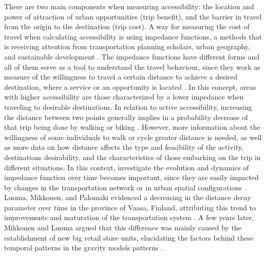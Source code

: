 \documentclass[preprint, 3p,
authoryear]{elsarticle} %
\begin{document}
There are two main components when measuring accessibility: the location
and power of attraction of urban opportunities (trip benefit), and the
barrier in travel from the origin to the destination (trip cost). A way
for measuring the cost of travel when calculating accessibility is using
impedance functions, a methods that is receiving attention from
transportation planning scholars, urban geography, and sustainable
development
\citep{frank2005linking, krizek2005perspectives, currie2010quantifying, iacono2010, yang2012walking, millward2013active, nassir2016utility, saghapour2017measuring, wu2019measuring}.
The impedance functions have different forms and all of them serve as a
tool to understand the travel behaviour, since they work as measure of
the willingness to travel a certain distance to achieve a desired
destination, where a service or an opportunity is located
\citep{taylor1975distance, fotheringham1981spatial, kwan1998space, eldridge1991warped, luoma1993threshold, papa2012gravity, yang2012walking, millward2013active, vale2017influence}.
In this concept, areas with higher accessibility are those characterized
by a lower impedance when traveling to desirable destinations. In
relation to active accessibility, increasing the distance between two
points generally implies in a probability decrease of that trip being
done by walking or biking
\citep{hansen1959accessibility, pirie1979measuring, handy1997measuring, geurs2001accessibility, bhat2002development, church2003measuring, kwan2003recent, geurs2004, levinson2005access, cascetta2013new}.
However, more information about the willingness of some individuals to
walk or cycle greater distance is needed, as well as more data on how
distance affects the type and feasibility of the activity, destinations
desirability, and the characteristics of those embarking on the trip in
different situations. In this context, investigate the evolution and
dynamics of impedance function over time becomes important, since they
are easily impacted by changes in the transportation network or in urban
spatial configurations \citep{iacono2008access, iacono2010}. Luoma,
Mikkonen, and Palomaki \citeyearpar{luoma1993threshold} evidenced a
decreasing in the distance decay parameter over time in the province of
Vaasa, Finland, attributing this trend to improvements and maturation of
the transportation system \citep{luoma1993threshold}. A few years later,
Mikkonen and Luoma \citeyearpar{mikkonen1999parameters} argued that this
difference was mainly caused by the establishment of new big retail
store units, elucidating the factors behind these temporal patterns in
the gravity models patterns \citep{mikkonen1999parameters}.
\end{document}
